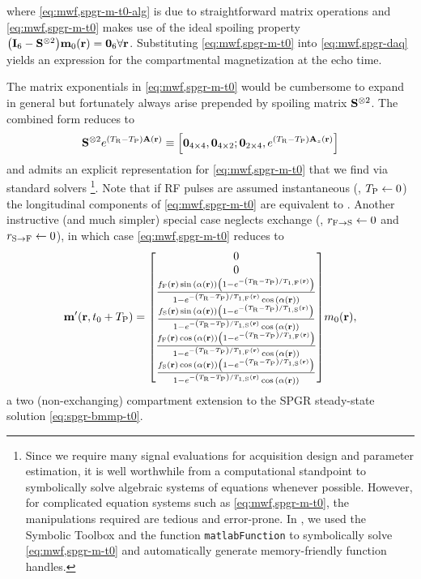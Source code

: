 where \eqref{eq:mwf,spgr-m-t0-alg} is due
to straightforward matrix operations
and \eqref{eq:mwf,spgr-m-t0} makes use 
of the ideal spoiling property
$\paren{\eye{6}-\bmSsix}\bmmzero\pr = \zeros{6}\xspace \forall\bmr$.
Substituting \eqref{eq:mwf,spgr-m-t0}
into \eqref{eq:mwf,spgr-daq}
yields an expression
for the compartmental magnetization 
at the echo time.

The matrix exponentials 
in \eqref{eq:mwf,spgr-m-t0} 
would be cumbersome to expand in general
but fortunately always arise
prepended by spoiling matrix $\mathbf{S}^{\otimes2}$.
The combined form reduces to
\begin{align}
	\bmSsix e^{\paren{\TR-\TP}\bmA\pr} \equiv
		\brac{\zeros{4 \times 4}, \zeros{4 \times 2}; 
		\zeros{2 \times 4}, e^{\paren{\TR-\TP} \bmAz\pr}}
	\label{eq:mwf,spgr-spoil-simp}
\end{align}
and admits 
an explicit representation 
for \eqref{eq:mwf,spgr-m-t0}
that we find
via standard solvers
\footnote{Since we require many signal evaluations
	for acquisition design
	and parameter estimation,
	it is well worthwhile 
	from a computational standpoint
	to symbolically solve
	algebraic systems of equations
	whenever possible.
	However, 
	for complicated equation systems 
	such as \eqref{eq:mwf,spgr-m-t0}, 
	the manipulations required 
	are tedious and error-prone.
	In \matlab,
	we used the Symbolic Toolbox 
	and the function \texttt{matlabFunction}
	to symbolically solve \eqref{eq:mwf,spgr-m-t0}
	and automatically generate 
	memory-friendly function handles. 
}. 
Note that
if RF pulses are assumed instantaneous
(\ie, $T_\mathrm{P} \gets 0$)
the longitudinal components
of \eqref{eq:mwf,spgr-m-t0}
are equivalent to \cite[Eq.~34]{spencer:00:mos}.
Another instructive (and much simpler) special case
neglects exchange
(\ie, $r_{\mathrm{F}\to\mathrm{S}} \gets 0$ and $r_{\mathrm{S}\to\mathrm{F}} \gets 0$),
in which case \eqref{eq:mwf,spgr-m-t0} reduces to
\begin{align}
	\bmmp\paren{\bmr,t_0+\TP} =
	\begin{bmatrix}
		0 \\
		0 \\
		\frac{\ff\pr \sina{\flip\pr}\paren{1-e^{-\paren{\TR-\TP}/\tf{1}\pr}}}
			{1-e^{-\paren{\TR-\TP}/\tf{1}\pr}\cosa{\flip\pr}} \\
		\frac{\fs\pr \sina{\flip\pr}\paren{1-e^{-\paren{\TR-\TP}/\ts{1}\pr}}}
			{1-e^{-\paren{\TR-\TP}/\ts{1}\pr}\cosa{\flip\pr}} \\
		\frac{\ff\pr \cosa{\flip\pr}\paren{1-e^{-\paren{\TR-\TP}/\tf{1}\pr}}}
			{1-e^{-\paren{\TR-\TP}/\tf{1}\pr}\cosa{\flip\pr}} \\
		\frac{\fs\pr \cosa{\flip\pr}\paren{1-e^{-\paren{\TR-\TP}/\ts{1}\pr}}}
			{1-e^{-\paren{\TR-\TP}/\ts{1}\pr}\cosa{\flip\pr}}
	\end{bmatrix}
	\mzero\pr,
	\label{eq:mwf-spgr-m-t0-exchg0}
\end{align}
a two (non-exchanging) compartment extension
to the SPGR steady-state solution \eqref{eq:spgr-bmmp-t0}.

